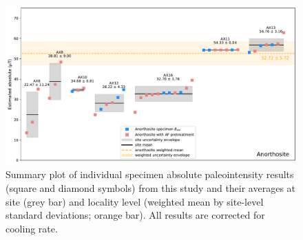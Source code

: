 \documentclass[9pt,twocolumn,twoside,lineno]{pnas-new}
\begin{document}
\begin{figure}[h!]
\noindent\includegraphics[width=17.8 cm]{Paleointensity_plot_cooling_corrected.pdf}
\centering
\caption{\small{Summary plot of individual specimen absolute paleointensity results (square and diamond symbols) from this study and their averages at site (grey bar) and locality level (weighted mean by site-level standard deviations; orange bar). All results are corrected for cooling rate. }}
\label{fig:PINT_cooling_corrected}
\end{figure}
\end{document}
